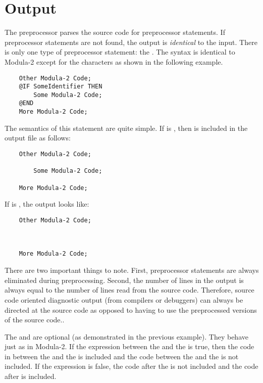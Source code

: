 \section{Output}

The preprocessor parses the source code for preprocessor statements.
If preprocessor statements are not found, the output is {\em identical}
to the input.  There is only one type of preprocessor statement:
the .  The syntax is identical to Modula-2 
except for the  characters as shown in the following example.

\begin{verbatim}
    Other Modula-2 Code;
    @IF SomeIdentifier THEN
        Some Modula-2 Code;
    @END
    More Modula-2 Code;
\end{verbatim}

The semantics of this statement are quite simple.  If 
is , then  is included in 
the output file as follows:

\begin{verbatim}
    Other Modula-2 Code;
    
        Some Modula-2 Code;
    
    More Modula-2 Code;
\end{verbatim}

If  is , the output looks like:

\begin{verbatim}
    Other Modula-2 Code;
    

    
    More Modula-2 Code;
\end{verbatim}

There are two important things to note.  First, preprocessor statements 
are always eliminated during preprocessing.  Second, the number of lines
in the output is always equal to the number of lines read from the
source code.  Therefore, source code oriented diagnostic output (from
compilers or debuggers) can always be directed at the source code
as opposed to having to use the preprocessed versions of the source
code..

The  and  are 
optional (as demonstrated in the previous
example).  They behave just as in Modula-2.  If the expression between
the  and the  is true, then the code in between
the  and the  is included and the code between
the  and the  is not included.  If the expression
is false, the code after the  is not included and the
code after  is included.

